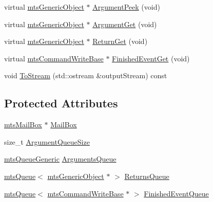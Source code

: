 \begin{DoxyCompactItemize}
virtual \hyperlink{classmts_generic_object}{mts\+Generic\+Object} $\ast$ \hyperlink{classmts_command_queued_write_return_base_a401a5f448de3fccd1fb164443e4950c1}{Argument\+Peek} (void)
\item 
virtual \hyperlink{classmts_generic_object}{mts\+Generic\+Object} $\ast$ \hyperlink{classmts_command_queued_write_return_base_ac990bbaa33da59f15662c78b569bb7d8}{Argument\+Get} (void)
\item 
virtual \hyperlink{classmts_generic_object}{mts\+Generic\+Object} $\ast$ \hyperlink{classmts_command_queued_write_return_base_a46c9521b17082860b27884a880ba2d84}{Return\+Get} (void)
\item 
virtual \hyperlink{classmts_command_write_base}{mts\+Command\+Write\+Base} $\ast$ \hyperlink{classmts_command_queued_write_return_base_ad5cf9aa9b24a5cc8b5e63c727471d748}{Finished\+Event\+Get} (void)
\item 
void \hyperlink{classmts_command_queued_write_return_base_ad9ed47f186820a6bdf3de9f11101fbe0}{To\+Stream} (std\+::ostream \&output\+Stream) const 
\end{DoxyCompactItemize}
\subsection*{Protected Attributes}
\begin{DoxyCompactItemize}
\item 
\hyperlink{classmts_mail_box}{mts\+Mail\+Box} $\ast$ \hyperlink{classmts_command_queued_write_return_base_ab619fecbd720f4b87db6169d1f210e16}{Mail\+Box}
\item 
size\+\_\+t \hyperlink{classmts_command_queued_write_return_base_a3ca30eb9477f0e972799e27948707375}{Argument\+Queue\+Size}
\item 
\hyperlink{classmts_queue_generic}{mts\+Queue\+Generic} \hyperlink{classmts_command_queued_write_return_base_ac846c793220de2f8b31357230428434f}{Arguments\+Queue}
\item 
\hyperlink{classmts_queue}{mts\+Queue}$<$ \hyperlink{classmts_generic_object}{mts\+Generic\+Object} $\ast$ $>$ \hyperlink{classmts_command_queued_write_return_base_a24118cfab2f7edbc060a3513787900c7}{Returns\+Queue}
\item 
\hyperlink{classmts_queue}{mts\+Queue}$<$ \hyperlink{classmts_command_write_base}{mts\+Command\+Write\+Base} $\ast$ $>$ \hyperlink{classmts_command_queued_write_return_base_aea7fcf280a846a7d73fb7ba81499e858}{Finished\+Event\+Queue}
\end{DoxyCompactItemize}


